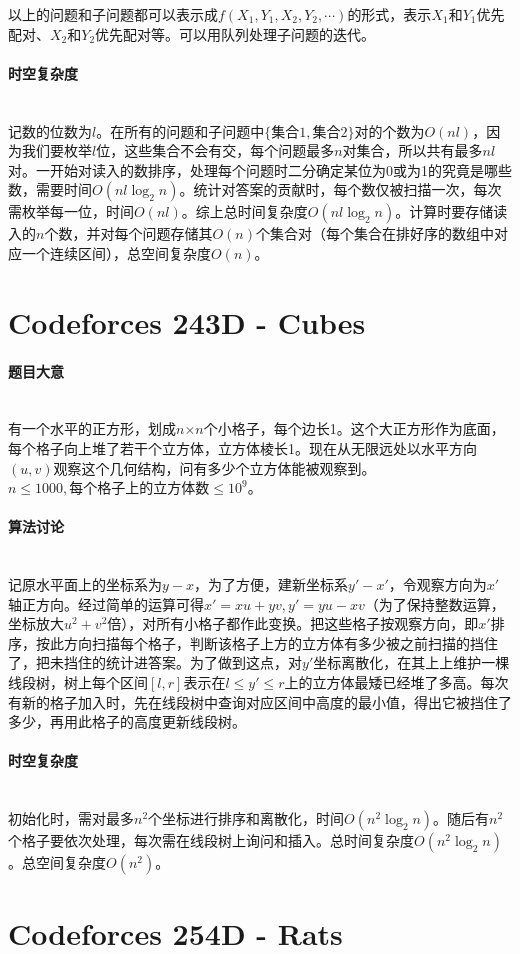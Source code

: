 \documentclass[UTF8]{ctexart}
\newcommand{\myparagraph}[1]{\paragraph{#1}\mbox{}\\}
\theoremstyle{nonumberplain}
\begin{document}
			以上的问题和子问题都可以表示成$f({X_1,Y_1},{X_2,Y_2},\cdots)$的形式，表示$X_1$和$Y_1$优先配对、$X_2$和$Y_2$优先配对等。可以用队列处理子问题的迭代。
		
		\myparagraph{时空复杂度}
		
			记数的位数为$l$。在所有的问题和子问题中$\{\mbox{集合}1,\mbox{集合}2\}$对的个数为$O(nl)$，因为我们要枚举$l$位，这些集合不会有交，每个问题最多$n$对集合，所以共有最多$nl$对。一开始对读入的数排序，处理每个问题时二分确定某位为0或为1的究竟是哪些数，需要时间$O(nl\log_2n)$。统计对答案的贡献时，每个数仅被扫描一次，每次需枚举每一位，时间$O(nl)$。综上总时间复杂度$O(nl\log_2n)$。计算时要存储读入的$n$个数，并对每个问题存储其$O(n)$个集合对（每个集合在排好序的数组中对应一个连续区间），总空间复杂度$O(n)$。
	
	\section{Codeforces 243D - Cubes}
	
		\myparagraph{题目大意}
		
			有一个水平的正方形，划成$n$×$n$个小格子，每个边长1。这个大正方形作为底面，每个格子向上堆了若干个立方体，立方体棱长1。现在从无限远处以水平方向$(u,v)$观察这个几何结构，问有多少个立方体能被观察到。$n \leq 1000, \mbox{每个格子上的立方体数} \leq 10^9$。
		
		\myparagraph{算法讨论}
		
			记原水平面上的坐标系为$y-x$，为了方便，建新坐标系$y'-x'$，令观察方向为$x'$轴正方向。经过简单的运算可得$x'=xu+yv, y'=yu-xv$（为了保持整数运算，坐标放大$u^2+v^2$倍），对所有小格子都作此变换。把这些格子按观察方向，即$x'$排序，按此方向扫描每个格子，判断该格子上方的立方体有多少被之前扫描的挡住了，把未挡住的统计进答案。为了做到这点，对$y'$坐标离散化，在其上上维护一棵线段树，树上每个区间$[l,r]$表示在$l \leq y' \leq r$上的立方体最矮已经堆了多高。每次有新的格子加入时，先在线段树中查询对应区间中高度的最小值，得出它被挡住了多少，再用此格子的高度更新线段树。
		
		\myparagraph{时空复杂度}
		
			初始化时，需对最多$n^2$个坐标进行排序和离散化，时间$O(n^2\log_2n)$。随后有$n^2$个格子要依次处理，每次需在线段树上询问和插入。总时间复杂度$O(n^2\log_2n)$。总空间复杂度$O(n^2)$。
	
	\section{Codeforces 254D - Rats}
	
\end{document}
